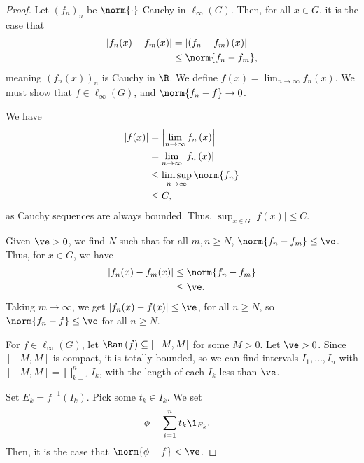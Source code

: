 \begin{proof}
  Let $\left(f_n\right)_n$ be $\norm{\cdot}$-Cauchy in $\ell_{\infty}\left(G\right)$. Then, for all $x\in G$, it is the case that
  \begin{align*}
    \left\vert f_n(x) - f_m(x) \right\vert &= \left\vert \left(f_n - f_m\right)\left(x\right) \right\vert\\
                                           &\leq \norm{f_n - f_m},
  \end{align*}
  meaning $\left(f_n\left(x\right)\right)_n$ is Cauchy in $\R$. We define $f(x) = \lim_{n\rightarrow\infty}f_n(x)$. We must show that $f\in \ell_{\infty}\left(G\right)$, and $\norm{f_n-f}\rightarrow 0$.\newline

  We have
  \begin{align*}
    \left\vert f(x) \right\vert &= \left\vert \lim_{n\rightarrow\infty}f_n\left(x\right) \right\vert\\
                                &= \lim_{n\rightarrow\infty}\left\vert f_n\left(x\right) \right\vert\\
                                &\leq \limsup_{n\rightarrow\infty}\norm{f_n}\\
                                &\leq C,
  \end{align*}
  as Cauchy sequences are always bounded. Thus, $\sup_{x\in G}\left\vert f(x) \right\vert\leq C$.\newline

  Given $\ve > 0$, we find $N$ such that for all $m,n\geq N$, $\norm{f_n - f_m} \leq \ve$. Thus, for $x\in G$, we have
  \begin{align*}
    \left\vert f_n(x) - f_m(x) \right\vert &\leq \norm{f_n - f_m}\\
                                           &\leq \ve.
  \end{align*}
  Taking $m\rightarrow\infty$, we get $\left\vert f_n(x) - f(x) \right\vert \leq \ve$, for all $n\geq N$, so $\norm{f_n - f}\leq \ve$ for all $n\geq N$.\newline

  For $f\in \ell_{\infty}\left(G\right)$, let $\Ran\left(f\right) \subseteq \left[-M,M\right]$ for some $M > 0$. Let $\ve > 0$. Since $\left[-M,M\right]$ is compact, it is totally bounded, so we can find intervals $I_{1},\dots,I_n$ with $\left[-M,M\right] = \bigsqcup_{k=1}^{n}I_k$, with the length of each $I_k$ less than $\ve$.\newline

  Set $E_k = f^{-1}\left(I_k\right)$. Pick some $t_k\in I_k$. We set
  \begin{align*}
    \phi &= \sum_{i=1}^{n}t_k\1_{E_k}.
  \end{align*}
  Then, it is the case that $\norm{\phi - f} < \ve$.
\end{proof}
